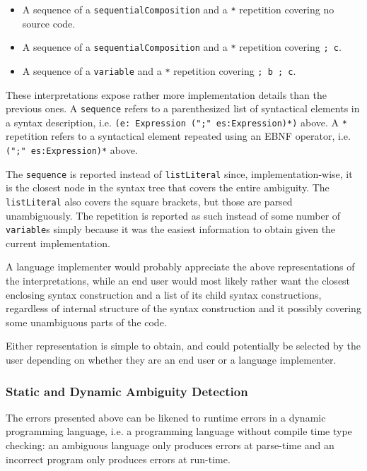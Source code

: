 \documentclass{kththesis}
\begin{document}
\begin{itemize}
  \item A sequence of a \texttt{sequentialComposition} and a \texttt{*} repetition covering no source code.
  \item A sequence of a \texttt{sequentialComposition} and a \texttt{*} repetition covering \texttt{; c}.
  \item A sequence of a \texttt{variable} and a \texttt{*} repetition covering \texttt{; b ; c}.
\end{itemize}

These interpretations expose rather more implementation details than the previous ones. A \texttt{sequence} refers to a parenthesized list of syntactical elements in a syntax description, i.e. \texttt{(e: Expression (";" es:Expression)*)} above. A \texttt{*} repetition refers to a syntactical element repeated using an EBNF operator, i.e. \texttt{(";" es:Expression)*} above.

The \texttt{sequence} is reported instead of \texttt{listLiteral} since, implementation-wise, it is the closest node in the syntax tree that covers the entire ambiguity. The \texttt{listLiteral} also covers the square brackets, but those are parsed unambiguously. The repetition is reported as such instead of some number of \texttt{variable}s simply because it was the easiest information to obtain given the current implementation.

A language implementer would probably appreciate the above representations of the interpretations, while an end user would most likely rather want the closest enclosing syntax construction and a list of its child syntax constructions, regardless of internal structure of the syntax construction and it possibly covering some unambiguous parts of the code.

Either representation is simple to obtain, and could potentially be selected by the user depending on whether they are an end user or a language implementer.

\subsubsection{Static and Dynamic Ambiguity Detection} \label{sec:static-dynamic-ambiguity}

The errors presented above can be likened to runtime errors in a dynamic programming language, i.e. a programming language without compile time type checking: an ambiguous language only produces errors at parse-time and an incorrect program only produces errors at run-time.
\end{document}
